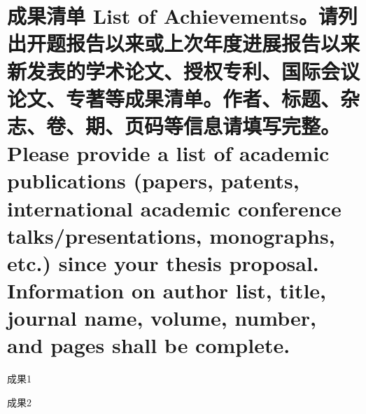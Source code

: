 \documentclass[a4paper,zihao=-4,AutoFakeBold]{ctexart}
\begin{document}
\section{成果清单 List of Achievements。\mdseries 请列出开题报告以来或上次年度进展报告以来新发表的学术论文、授权专利、国际会议论文、专著等成果清单。作者、标题、杂志、卷、期、页码等信息请填写完整。Please provide a list of academic publications (papers, patents, international academic conference talks/presentations, monographs, etc.) since your thesis proposal. Information on author list, title, journal name, volume, number, and pages shall be complete.}

\begin{enumerate}[label={[\arabic*]}]
  \item 成果1
  \item 成果2
\end{enumerate}


\makesignature
\end{document}
